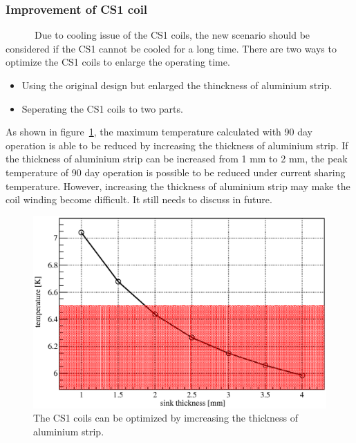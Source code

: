 \subsubsection{Improvement of CS1 coil}
~~~~~~Due to cooling issue of the CS1 coils, the new scenario should be considered if the CS1 cannot be cooled for a long time.
There are two ways to optimize the CS1 coils to enlarge the operating time.
\begin{itemize}
 \setlength{\itemsep}{-5pt}
 \item Using the original design but enlarged the thinckness of aluminium strip.
 \item Seperating the CS1 coils to two parts.
\end{itemize}
As shown in figure~\ref{5opti}, the maximum temperature calculated with 90 day operation is able to be reduced by increasing the thickness of aluminium strip.
If the thickness of aluminium strip can be increased from 1 mm to 2 mm, the peak temperature of 90 day operation is possible to be reduced under current sharing temperature.
However, increasing the thickness of aluminium strip may make the coil winding become difficult.
It still needs to discuss in future.
\begin{figure}[H]
 \centering
 \includegraphics[scale=0.45]{chapter6/fig/Strip.eps}
 \caption{ The CS1 coils can be optimized by imcreasing the thickness of aluminium strip.}
 \label{5opti}
\end{figure}

